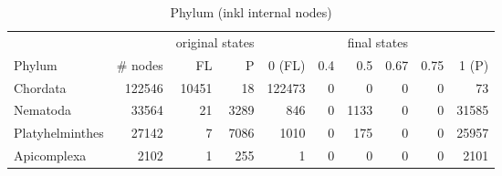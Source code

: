 
      \begin{table}[h!]
        \begin{center}
          \begin{tabular}{ |l|r||r|r||r|r|r|r|r|r| }
            \hline
            & & \multicolumn{2}{c||}{original states} & \multicolumn{6}{c|}{final states} \\
            Phylum & \# nodes & FL & P
              & 0 (FL) & 0.4 & 0.5 & 0.67 & 0.75 & 1 (P) \\
            \hline \hline
            Chordata & 122546 & 10451 & 18 
              & 122473 & 0 & 0 & 0 & 0 & 73 \\
            Nematoda & 33564 & 21 & 3289 
              & 846 & 0 & 1133 & 0 & 0 & 31585 \\
            Platyhelminthes & 27142 & 7 & 7086 
              & 1010 & 0 & 175 & 0 & 0 & 25957 \\
            Apicomplexa & 2102 & 1 & 255 
              & 1 & 0 & 0 & 0 & 0 & 2101 \\
            \hline
          \end{tabular}
        \end{center}
        \caption{Phylum (inkl internal nodes)}
        \label{table:Phylum internal nodes}
      \end{table}

